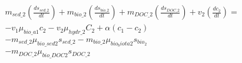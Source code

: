 \documentclass[fleqn, oneside, 11pt]{article}%
\begin{document}
\begin{preview}
\begin{align*}%
&m_{sed\_2} \left(\frac{ds_{sed\_2}}{dt}\right) + m_{bio\_2} \left(\frac{ds_{bio\_2}}{dt}\right) + m_{DOC\_2} \left(\frac{ds_{DOC\_2}}{dt}\right) + v_{2} \left(\frac{dc_{2}}{dt}\right) = \nonumber \\
&-v_{1}\mu_{bio\_a1}c_{2} - v_{2}\mu_{hydr\_2}C_{2} + \alpha(c_{1} - c_{2}) \nonumber \\
&-m_{sed\_2}\mu_{bio\_sed2}s_{sed\_2} - m_{bio\_2}\mu_{bio_biota2}s_{bio_2} \nonumber \\
&-m_{DOC\_2}\mu_{bio\_DOC2}s_{DOC\_2} \nonumber \\
\end{align*} 
\end{preview}
\end{document}
